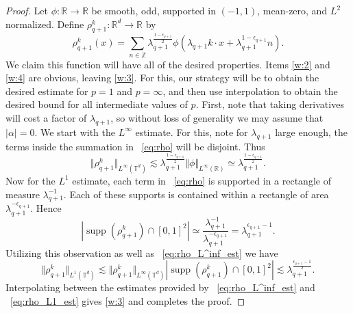 \documentclass[12pt,reqno,letterpaper]{amsart}
\numberwithin{equation}{section}
\newcommand{\1}{{\bf 1}}
\newcommand{\2}{{\bf 2}}
\newcommand{\R}{\mathbb R}
\newcommand{\T}{\mathbb T}
\newcommand{\Z}{\mathbb Z}
\theoremstyle{remark}
\theoremstyle{remark}
\begin{document}
\begin{proof}
    Let $\phi:\R \to \R$ be smooth, odd, supported in $(-1,1)$, mean-zero, and $L^2$ normalized. Define $\rho_{q+1}^k:\R^d \to \R$ by
    \begin{equation}\label{eq:rho}
        \rho^k_{q+1}(x) = \sum_{n \in \Z} \lambda_{q+1}^{\frac{1-\epsilon_{q+1}}{2}} \phi\left(\lambda_{q+1}k \cdot x +\lambda_{q+1}^{1-\epsilon_{q+1}}n\right).
    \end{equation}
    We claim this function will have all of the desired properties. Items \ref{w:2} and \ref{w:4} are obvious, leaving \ref{w:3}. For this, our strategy will be to obtain the desired estimate for $p = 1$ and $p = \infty$, and then use interpolation to obtain the desired bound for all intermediate values of $p$. First, note that taking derivatives will cost a factor of $\lambda_{q+1}$, so without loss of generality we may assume that $|\alpha| = 0$. We start with the $L^\infty$ estimate. For this, note for $\lambda_{q+1}$ large enough, the terms inside the summation in ~\eqref{eq:rho} will be disjoint. Thus
    \begin{equation}\label{eq:rho_L^inf_est}
        \Vert \rho^k_{q+1} \Vert_{L^\infty(\T^d)} \lesssim \lambda_{q+1}^{\frac{1-\epsilon_{q+1}}{2}} \Vert \phi \Vert_{L^{\infty}(\R)} \simeq \lambda_{q+1}^{\frac{1-\epsilon_{q+1}}{2}}.
    \end{equation}
    Now for the $L^1$ estimate, each term in ~\eqref{eq:rho} is supported in a rectangle of measure $\lambda_{q+1}^{-1}$. Each of these supports is contained within a rectangle of area $\lambda_{q+1}^{-\epsilon_{q+1}}$. Hence
    $$
        \left|\operatorname{supp}\left(\rho_{q+1}^k\right) \cap [0,1]^2 \right| \simeq \frac{\lambda_{q+1}^{-1}}{\lambda_{q+1}^{-\epsilon_{q+1}}} = \lambda_{q+1}^{\epsilon_{q+1}-1}.
    $$
    Utilizing this observation as well as ~\eqref{eq:rho_L^inf_est} we have
    \begin{equation}\label{eq:rho_L1_est}
        \Vert \rho_{q+1}^k \Vert_{L^1(\T^d)} \lesssim \Vert \rho_{q+1}^k \Vert_{L^\infty(\T^d)} \left|\operatorname{supp}\left(\rho_{q+1}^k\right) \cap [0,1]^2 \right| \lesssim \lambda_{q+1}^{\frac{\epsilon_{q+1}-1}{2}}.
    \end{equation}
    Interpolating \cite{Stein} between the estimates provided by ~\eqref{eq:rho_L^inf_est} and ~\eqref{eq:rho_L1_est} gives \ref{w:3} and completes the proof.
\end{proof}
\end{document}
